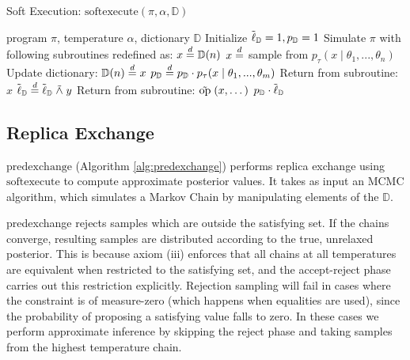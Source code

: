 \begin{algorithm}[tb]
  \caption{Soft Execution: $\textrm{softexecute}(\pi, \alpha, \mathbb{D})$}
  \label{alg:softexecute}
\begin{algorithmic}
 program $\pi$, temperature $\alpha$, dictionary $\mathbb{D}$
\STATE Initialize $\tilde{\operatorname{\ell}}_\mathbb{D} = 1, p_\mathbb{D} = 1$
\STATE Simulate $\pi$ with following subroutines redefined as:   
   \STATE $x \stackrel {d}{=} \mathbb{D}(n)$
 \ELSE
   \STATE $x \stackrel {d}{=} $ sample from $p_\tau(x \mid \theta_1, ..., \theta_n)$
   \STATE Update dictionary: $\mathbb{D}(n) \stackrel {d}{=} x$
 \ENDIF
 \STATE $p_\mathbb{D} \stackrel {d}{=} p_\mathbb{D} \cdot p_\tau(x \mid \theta_1, ..., \theta_m)$
 \STATE Return from subroutine: $x$
\ENDALOOP
\STATE
{}
  \STATE $\tilde{\operatorname{\ell}}_\mathbb{D} \stackrel {d}{=} \tilde{\operatorname{\ell}}_\mathbb{D} \mathrel{\tilde{\land}} y$
\ENDALOOP
\STATE
{}
  \STATE Return from subroutine: $\mathrel{\tilde{\textrm{op}}}(x, \dots)$ 
\ENDALOOP
\STATE
{} $p_\mathbb{D} \cdot \tilde{\operatorname{\ell}}_\mathbb{D}$
\end{algorithmic}
\end{algorithm}

\subsection{Replica Exchange}

$\textrm{predexchange}$ (Algorithm \ref{alg:predexchange}) performs replica exchange using $\textrm{softexecute}$ to compute approximate posterior values.
It takes as input an MCMC algorithm, which simulates a Markov Chain by manipulating elements of the $\mathbb{D}$.

predexchange rejects samples which are outside the satisfying set.
If the chains converge, resulting samples are distributed according to the true, unrelaxed posterior.
This is because axiom (iii) enforces that all chains at all temperatures are equivalent when restricted to the satisfying set, and the accept-reject phase carries out this restriction explicitly.
Rejection sampling will fail in cases where the constraint is of measure-zero (which happens when equalities are used), since the probability of proposing a satisfying value falls to zero.  In these cases we perform approximate inference by skipping the reject phase and taking samples from the highest temperature chain.

